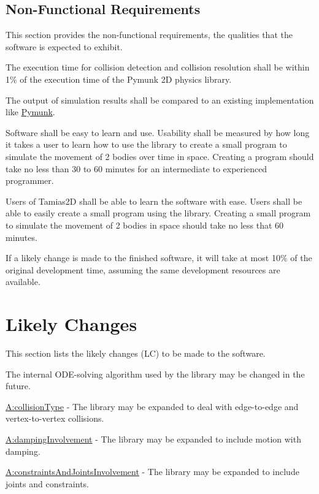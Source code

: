 \documentclass[12pt]{article}
\begin{document}
\subsection{Non-Functional Requirements}
\label{Sec:NFRs}
This section provides the non-functional requirements, the qualities that the software is expected to exhibit.

\begin{description}[font=\normalfont]
\item[Performance:\phantomsection\label{performance}]{The execution time for collision detection and collision resolution shall be within 1$\%$ of the execution time of the Pymunk 2D physics library.}
\item[Correctness:\phantomsection\label{correctness}]{The output of simulation results shall be compared to an existing implementation like \hyperref{http://www.pymunk.org/en/latest/}{}{}{Pymunk}.}
\item[Usability:\phantomsection\label{usability}]{Software shall be easy to learn and use. Usability shall be measured by how long it takes a user to learn how to use the library to create a small program to simulate the movement of 2 bodies over time in space. Creating a program should take no less than 30 to 60 minutes for an intermediate to experienced programmer.}
\item[Understandability:\phantomsection\label{understandability}]{Users of Tamias2D shall be able to learn the software with ease. Users shall be able to easily create a small program using the library. Creating a small program to simulate the movement of 2 bodies in space should take no less that 60 minutes.}
\item[Maintainability:\phantomsection\label{maintainability}]{If a likely change is made to the finished software, it will take at most 10$\%$ of the original development time, assuming the same development resources are available.}
\end{description}
\section{Likely Changes}
\label{Sec:LCs}
This section lists the likely changes (LC) to be made to the software.

\begin{description}[font=\normalfont]
\item[Variable-ODE-Solver:\phantomsection\label{lcVODES}]{The internal ODE-solving algorithm used by the library may be changed in the future.}
\item[Expanded-Collisions:\phantomsection\label{lcEC}]{\hyperref[assumpCT]{A:collisionType} - The library may be expanded to deal with edge-to-edge and vertex-to-vertex collisions.}
\item[Include-Dampening:\phantomsection\label{lcID}]{\hyperref[assumpDI]{A:dampingInvolvement} - The library may be expanded to include motion with damping.}
\item[Include-Joints-Constraints:\phantomsection\label{lcIJC}]{\hyperref[assumpCAJI]{A:constraintsAndJointsInvolvement} - The library may be expanded to include joints and constraints.}
\end{description}
\end{document}
